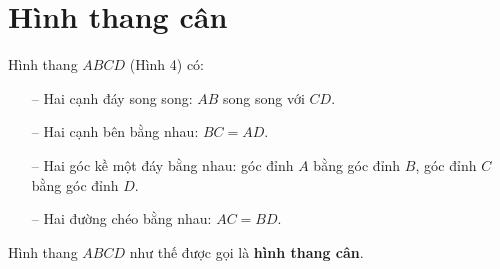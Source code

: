 \documentclass[12pt]{article}
\begin{document}
\section{Hình thang cân}
\begin{paracol}{2}
Hình thang \(ABCD\) (Hình 4) có:
\begin{itemize}
  \item[--] Hai cạnh đáy song song: \(AB\) song song với \(CD\).
  \item[--] Hai cạnh bên bằng nhau: \(BC = AD\).
  \item[--] Hai góc kề một đáy bằng nhau: góc đỉnh \(A\) bằng góc đỉnh \(B\), góc đỉnh \(C\) bằng góc đỉnh \(D\).
  \item[--] Hai đường chéo bằng nhau: \(AC = BD\).
\end{itemize}
Hình thang \(ABCD\) như thế được gọi là \textbf{hình thang cân}.
\switchcolumn
\begin{center}
\end{center}
\end{paracol}
\end{document}
